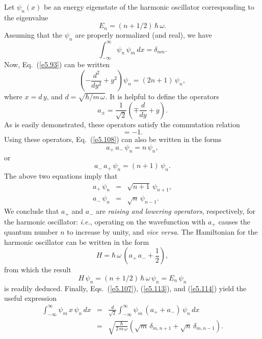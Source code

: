 Let $\psi_n(x)$ be an energy eigenstate of the harmonic oscillator
corresponding to the eigenvalue
\begin{equation}
E_n = (n+1/2)\,\hbar\,\omega.
\end{equation}
Assuming that the $\psi_n$ are properly normalized (and real), we have
\begin{equation}\label{e5.107}
\int_{-\infty}^\infty \psi_n\,\psi_m\,dx = \delta_{nm}.
\end{equation}
Now, Eq.~(\ref{e5.93}) can be written
\begin{equation}\label{e5.108}
\left(-\frac{d^2}{d y^2}+y^2\right)\psi_n = (2n+1)\,\psi_n,
\end{equation}
where $x = d\,y$, and $d=\sqrt{\hbar/m\,\omega}$. It is helpful to
define the operators
\begin{equation}\label{e5.109}
a_\pm = \frac{1}{\sqrt{2}}\left(\mp \frac{d}{dy}+y\right).
\end{equation}
As is easily demonstrated, these operators satisfy the commutation relation
\begin{equation}
[a_+,a_-] = -1.
\end{equation}
Using these operators, Eq.~(\ref{e5.108}) can also be written
in the forms
\begin{equation}
a_+\,a_-\,\psi_n = n\,\psi_n,
\end{equation}
or
\begin{equation}
a_-\,a_+\,\psi_n = (n+1)\,\psi_n.
\end{equation}
The above two equations imply that
\begin{eqnarray}\label{e5.113}
a_+\,\psi_n &=& \sqrt{n+1}\,\psi_{n+1},\\[0.5ex]
a_-\,\psi_n &=&\sqrt{n}\,\psi_{n-1}.\label{e5.114}
\end{eqnarray}
We conclude that $a_+$ and $a_-$ are {\em raising and lowering operators},
respectively, for the harmonic oscillator: {\em i.e.}, operating on the wavefunction with $a_+$ causes the
quantum number $n$ to increase by unity, and {\em vice versa}. 
The Hamiltonian for the harmonic oscillator can be written in the form
\begin{equation}
H = \hbar\,\omega\,\left(a_+\,a_- + \frac{1}{2}\right),
\end{equation}
from which the result
\begin{equation}
H\,\psi_n = (n+1/2)\,\hbar\,\omega\,\psi_n = E_n\,\psi_n
\end{equation}
is readily deduced.
Finally, Eqs.~(\ref{e5.107}), (\ref{e5.113}), and (\ref{e5.114})
yield the useful expression
\begin{eqnarray}\label{e5.xxx}
\int_{-\infty}^\infty \psi_m\,x\,\psi_n\,dx &=& \frac{d}{\sqrt{2}}\int_{-\infty}^{\infty}\psi_m\,(a_+ + a_-)\,\psi_n\,dx\\[0.5ex]
&=& \sqrt{\frac{\hbar}{2\,m\,\omega}}\left(\sqrt{m}\,\delta_{m,n+1} + \sqrt{n}\,\delta_{m,n-1}\right).\nonumber
\end{eqnarray}

